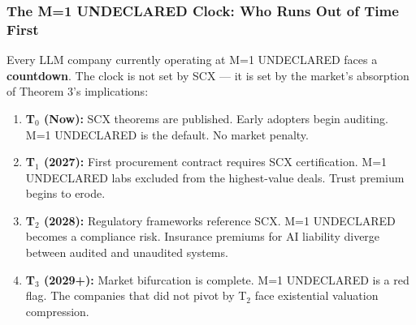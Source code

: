 \documentclass[12pt,a4paper]{article}
\theoremstyle{remark}
\begin{document}
\subsubsection{The M=1 UNDECLARED Clock: Who Runs Out of Time First}
Every LLM company currently operating at M=1 UNDECLARED faces a 
\textbf{countdown}. The clock is not set by SCX --- it is set by the 
market's absorption of Theorem 3's implications:
\begin{enumerate}[label=\textbf{T}, leftmargin=*]
 \item \textbf{T$_0$ (Now):} SCX theorems are published. Early adopters 
 begin auditing. M=1 UNDECLARED is the default. No market penalty.
 \item \textbf{T$_1$ (2027):} First procurement contract requires SCX 
 certification. M=1 UNDECLARED labs excluded from the highest-value 
 deals. Trust premium begins to erode.
 \item \textbf{T$_2$ (2028):} Regulatory frameworks reference SCX. 
 M=1 UNDECLARED becomes a compliance risk. Insurance premiums for 
 AI liability diverge between audited and unaudited systems.
 \item \textbf{T$_3$ (2029+):} Market bifurcation is complete. M=1 
 UNDECLARED is a red flag. The companies that did not pivot by 
 T$_2$ face existential valuation compression.
\end{enumerate}
\end{document}
